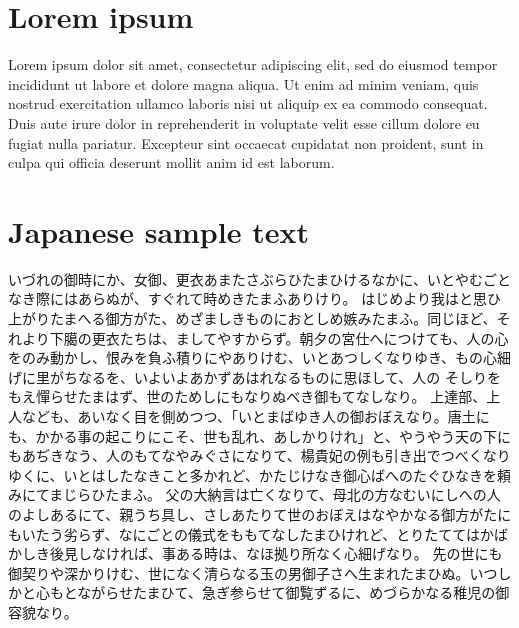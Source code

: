 \documentclass[a4paper,11pt]{TUmemorandum}
\begin{document}
\section*{Lorem ipsum}
%
Lorem ipsum dolor sit amet, consectetur adipiscing elit, sed do eiusmod tempor incididunt ut labore et dolore magna aliqua. Ut enim ad minim veniam, quis nostrud exercitation ullamco laboris nisi ut aliquip ex ea commodo consequat. Duis aute irure dolor in reprehenderit in voluptate velit esse cillum dolore eu fugiat nulla pariatur. Excepteur sint occaecat cupidatat non proident, sunt in culpa qui officia deserunt mollit anim id est laborum.
%
\section*{Japanese sample text}
%
いづれの御時にか、女御、更衣あまたさぶらひたまひけるなかに、いとやむごとなき際にはあらぬが、すぐれて時めきたまふありけり。
はじめより我はと思ひ上がりたまへる御方がた、めざましきものにおとしめ嫉みたまふ。同じほど、それより下臈の更衣たちは、ましてやすからず。朝夕の宮仕へにつけても、人の心をのみ動かし、恨みを負ふ積りにやありけむ、いとあつしくなりゆき、もの心細げに里がちなるを、いよいよあかずあはれなるものに思ほして、人の そしりをもえ憚らせたまはず、世のためしにもなりぬべき御もてなしなり。
上達部、上人なども、あいなく目を側めつつ、「いとまばゆき人の御おぼえなり。唐土にも、かかる事の起こりにこそ、世も乱れ、あしかりけれ」と、やうやう天の下にもあぢきなう、人のもてなやみぐさになりて、楊貴妃の例も引き出でつべくなりゆくに、いとはしたなきこと多かれど、かたじけなき御心ばへのたぐひなきを頼みにてまじらひたまふ。
父の大納言は亡くなりて、母北の方なむいにしへの人のよしあるにて、親うち具し、さしあたりて世のおぼえはなやかなる御方がたにもいたう劣らず、なにごとの儀式をももてなしたまひけれど、とりたててはかばかしき後見しなければ、事ある時は、なほ拠り所なく心細げなり。
先の世にも御契りや深かりけむ、世になく清らなる玉の男御子さへ生まれたまひぬ。いつしかと心もとながらせたまひて、急ぎ参らせて御覧ずるに、めづらかなる稚児の御容貌なり。
\printbibliography%
\end{document}
